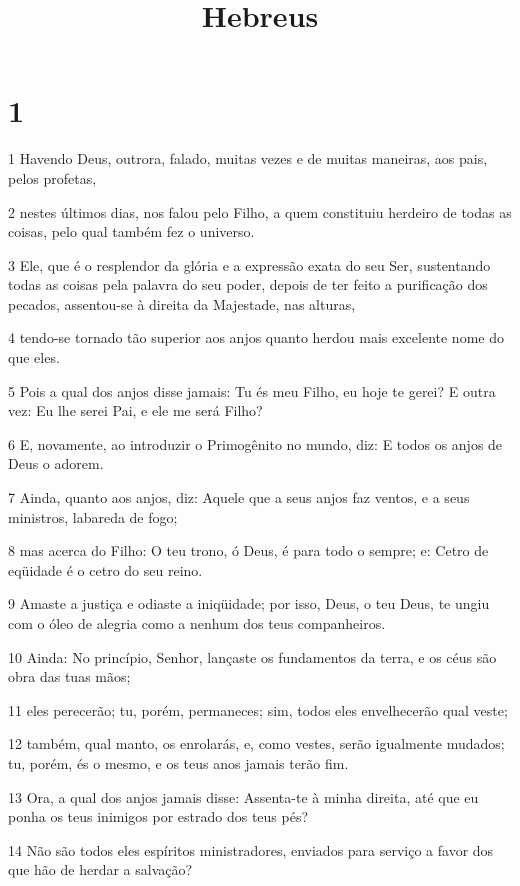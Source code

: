 

\title{Hebreus}


\chapter{1}

\par 1 Havendo Deus, outrora, falado, muitas vezes e de muitas maneiras, aos pais, pelos profetas,
\par 2 nestes últimos dias, nos falou pelo Filho, a quem constituiu herdeiro de todas as coisas, pelo qual também fez o universo.
\par 3 Ele, que é o resplendor da glória e a expressão exata do seu Ser, sustentando todas as coisas pela palavra do seu poder, depois de ter feito a purificação dos pecados, assentou-se à direita da Majestade, nas alturas,
\par 4 tendo-se tornado tão superior aos anjos quanto herdou mais excelente nome do que eles.
\par 5 Pois a qual dos anjos disse jamais: Tu és meu Filho, eu hoje te gerei? E outra vez: Eu lhe serei Pai, e ele me será Filho?
\par 6 E, novamente, ao introduzir o Primogênito no mundo, diz: E todos os anjos de Deus o adorem.
\par 7 Ainda, quanto aos anjos, diz: Aquele que a seus anjos faz ventos, e a seus ministros, labareda de fogo;
\par 8 mas acerca do Filho: O teu trono, ó Deus, é para todo o sempre; e: Cetro de eqüidade é o cetro do seu reino.
\par 9 Amaste a justiça e odiaste a iniqüidade; por isso, Deus, o teu Deus, te ungiu com o óleo de alegria como a nenhum dos teus companheiros.
\par 10 Ainda: No princípio, Senhor, lançaste os fundamentos da terra, e os céus são obra das tuas mãos;
\par 11 eles perecerão; tu, porém, permaneces; sim, todos eles envelhecerão qual veste;
\par 12 também, qual manto, os enrolarás, e, como vestes, serão igualmente mudados; tu, porém, és o mesmo, e os teus anos jamais terão fim.
\par 13 Ora, a qual dos anjos jamais disse: Assenta-te à minha direita, até que eu ponha os teus inimigos por estrado dos teus pés?
\par 14 Não são todos eles espíritos ministradores, enviados para serviço a favor dos que hão de herdar a salvação?

